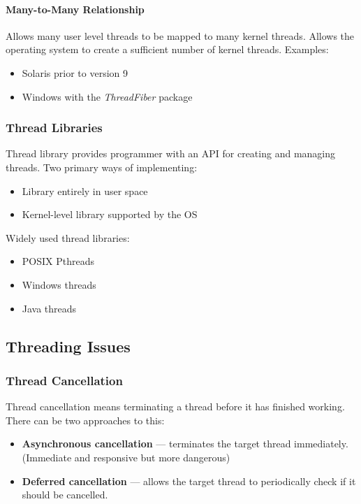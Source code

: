 \documentclass{article}%
\begin{document}
\paragraph{Many-to-Many Relationship}
Allows many user level threads to be mapped to many kernel threads.
Allows the operating system to create a sufficient number of kernel threads.
Examples:
\begin{itemize}
	\item Solaris prior to version 9
	\item Windows with the \textit{ThreadFiber} package
\end{itemize}

\subsubsection{Thread Libraries}
Thread library provides programmer with an API for creating and managing threads.
Two primary ways of implementing:
\begin{itemize}
	\item Library entirely in user space
	\item Kernel-level library supported by the OS
\end{itemize}
Widely used thread libraries:
\begin{itemize}
	\item POSIX Pthreads
	\item Windows threads
	\item Java threads
\end{itemize}

\subsection{Threading Issues}
\subsubsection{Thread Cancellation}
Thread cancellation means terminating a thread before it has finished working.
There can be two approaches to this:
\begin{itemize}
	\item \textbf{Asynchronous cancellation} --- terminates the target thread immediately. (Immediate and responsive but more dangerous)
	\item \textbf{Deferred cancellation} --- allows the target thread to periodically check if it should be cancelled.
\end{itemize}
\end{document}
